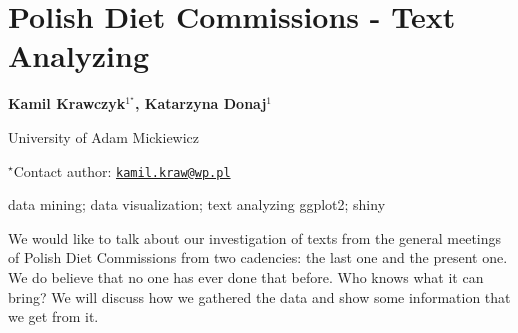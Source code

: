\documentclass[\main/boa.tex]{subfiles}
\begin{document}
\section{Polish Diet Commissions - Text Analyzing}

\begin{center}
  {\bf {} Kamil Krawczyk$^{1^\star}$,  Katarzyna Donaj$^{1}$}
\end{center}

\vskip 0.3cm

\begin{affiliations}
\begin{enumerate}
\begin{minipage}{0.915\textwidth}
\centering
\item University of Adam Mickiewicz \\[-2pt]
\end{minipage}
\end{enumerate}
$^\star$Contact author: \href{mailto:kamil.kraw@wp.pl}{\nolinkurl{kamil.kraw@wp.pl}}\\
\end{affiliations}

\vskip 0.5cm

\begin{minipage}{0.915\textwidth}
\keywords data mining; data visualization; text analyzing
\packages {} ggplot2;  shiny
\end{minipage}

\vskip 0.8cm

We would like to talk about our investigation of texts from the general
meetings of Polish Diet Commissions from two cadencies: the last one and
the present one. We do believe that no one has ever done that before.
Who knows what it can bring? We will discuss how we gathered the data
and show some information that we get from it.
\end{document}
